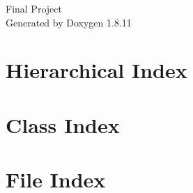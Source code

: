 \documentclass[twoside]{book}
\newcommand{\+}{\discretionary{\mbox{\scriptsize$\hookleftarrow$}}{}{}}
\newcommand{\clearemptydoublepage}{%
  \newpage{\pagestyle{empty}\cleardoublepage}%
}
\begin{document}
\hypersetup{pageanchor=false,
             bookmarksnumbered=true,
             pdfencoding=unicode
            }
\begin{titlepage}
\vspace*{7cm}
\begin{center}%
{\Large Final Project }\\
\vspace*{1cm}
{\large Generated by Doxygen 1.8.11}\\
\end{center}
\end{titlepage}
\clearemptydoublepage
\tableofcontents
\clearemptydoublepage
{}
\hypersetup{pageanchor=true}

\chapter{Hierarchical Index}

\chapter{Class Index}

\chapter{File Index}

\end{document}
